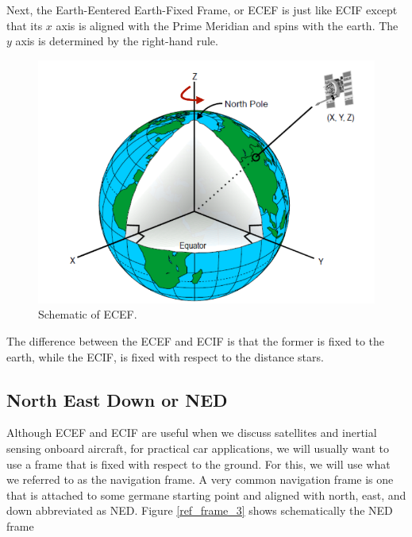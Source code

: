 Next, the Earth-Eentered Earth-Fixed Frame, or ECEF is just like ECIF except that its $x$ axis is aligned with the Prime
Meridian and spins with the earth. The $y$ axis is determined
by the right-hand rule. 

\begin{figure}[!htb]
\begin{center}
\includegraphics[scale=0.290]{img/coordinate_transforms/ref_frame_2.jpeg}
\end{center}
\caption{Schematic of ECEF.}
\label{ref_frame_2}
\end{figure}


The difference between the ECEF and ECIF is that the former is fixed to the earth, while the ECIF,  is fixed with
respect to the distance stars. 


\subsection{North East Down or NED}

Although ECEF and ECIF are useful when we discuss satellites and
inertial sensing onboard aircraft, for practical car applications, we will usually want to use a frame that
is fixed with respect to the ground. For this, we will use what we referred
to as the navigation frame. A very common navigation frame
is one that is attached to some germane starting point and
aligned with north, east, and down abbreviated as NED. Figure \ref{ref_frame_3} shows schematically the NED frame


